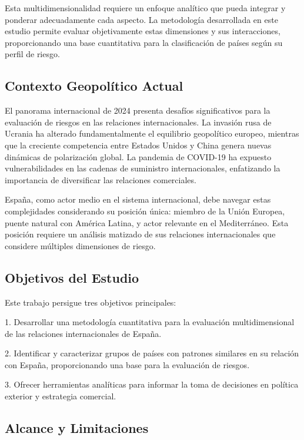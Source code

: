 \documentclass[11pt,a4paper]{article}
\begin{document}
Esta multidimensionalidad requiere un enfoque analítico que pueda integrar y ponderar adecuadamente cada aspecto. La metodología desarrollada en este estudio permite evaluar objetivamente estas dimensiones y sus interacciones, proporcionando una base cuantitativa para la clasificación de países según su perfil de riesgo.

\subsection{Contexto Geopolítico Actual}

El panorama internacional de 2024 presenta desafíos significativos para la evaluación de riesgos en las relaciones internacionales. La invasión rusa de Ucrania ha alterado fundamentalmente el equilibrio geopolítico europeo, mientras que la creciente competencia entre Estados Unidos y China genera nuevas dinámicas de polarización global. La pandemia de COVID-19 ha expuesto vulnerabilidades en las cadenas de suministro internacionales, enfatizando la importancia de diversificar las relaciones comerciales.

España, como actor medio en el sistema internacional, debe navegar estas complejidades considerando su posición única: miembro de la Unión Europea, puente natural con América Latina, y actor relevante en el Mediterráneo. Esta posición requiere un análisis matizado de sus relaciones internacionales que considere múltiples dimensiones de riesgo.

\subsection{Objetivos del Estudio}

Este trabajo persigue tres objetivos principales:

1. Desarrollar una metodología cuantitativa para la evaluación multidimensional de las relaciones internacionales de España.

2. Identificar y caracterizar grupos de países con patrones similares en su relación con España, proporcionando una base para la evaluación de riesgos.

3. Ofrecer herramientas analíticas para informar la toma de decisiones en política exterior y estrategia comercial.

\subsection{Alcance y Limitaciones}
\end{document}
